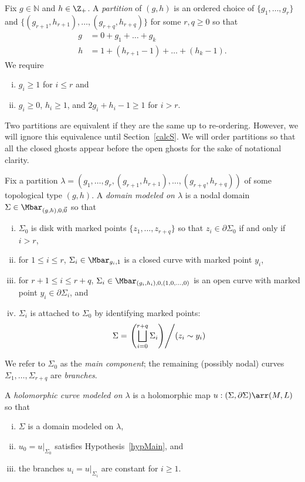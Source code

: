 \begin{definition} \label{partNum}
Fix $g \in \mathbb{N}$ and $h \in \Z_+$. A \emph{partition} of $(g,h)$ is an ordered choice of $\{g_1,\ldots,g_r\}$ and $\{(g_{r+1},h_{r+1}),\ldots,(g_{r+q},h_{r+q})\}$ for some $r,q \geq 0$ so that
\begin{align*}
g & = 0+g_1+\ldots+g_k
\\
h & = 1+(h_{r+1}-1)+\ldots+(h_k-1).
\end{align*}
We require
\begin{enumerate}[(i)]
\item $g_i \geq 1$ for $i \leq r$ and
\item $g_i \geq 0$, $h_i \geq 1$, and $2g_i+h_i-1 \geq 1$ for $i>r$.
\end{enumerate}
\end{definition}

\begin{remark}
Two partitions are equivalent if they are the same up to re-ordering. However, we will ignore this equivalence until Section~\ref{calcS}. We will order partitions so that all the closed ghosts appear before the open ghosts for the sake of notational clarity.
\end{remark}

\begin{definition} \label{partition}
Fix a partition $\lambda=(g_1,\ldots,g_r,(g_{r+1},h_{r+1}),\ldots,(g_{r+q},h_{r+q}))$ of some topological type $(g,h)$. A \emph{domain modeled on $\lambda$} is a nodal domain $\Sigma \in \Mbar_{(g,h),0,\vec{0}}$ so that
\begin{enumerate}[(i)]
\item $\Sigma_0$ is disk with marked points $\{z_1,\ldots,z_{r+q}\}$ so that $z_i \in \partial\Sigma_0$ if and only if $i>r$,
\item for $1 \leq i \leq r$, $\Sigma_i \in \Mbar_{g_i,1}$ is a closed curve with marked point $y_i$,
\item for $r+1 \leq i \leq r+q$, $\Sigma_i \in \Mbar_{(g_i,h_i),0,(1,0,\ldots,0)}$ is an open curve with marked point $y_i \in \partial\Sigma_i$, and
\item $\Sigma_i$ is attached to $\Sigma_0$ by identifying marked points:
\[
\Sigma=\left.\left( \bigsqcup\limits_{i=0}^{r+q} \Sigma_i \right) \middle/ (z_i \sim y_i) \right.
\]
\end{enumerate}
We refer to $\Sigma_0$ as the \emph{main component}; the remaining (possibly nodal) curves $\Sigma_1,\ldots,\Sigma_{r+q}$ are \emph{branches}.

A \emph{holomorphic curve modeled on $\lambda$} is a holomorphic map $u:(\Sigma,\partial\Sigma)\arr(M,L)$ so that
\begin{enumerate}[(i)]
\item $\Sigma$ is a domain modeled on $\lambda$,
\item $u_0=u|_{\Sigma_0}$ satisfies Hypothesis~\ref{hypMain}, and
\item the branches $u_i=u|_{\Sigma_i}$ are constant for $i \geq 1$.
\end{enumerate}
\end{definition}

